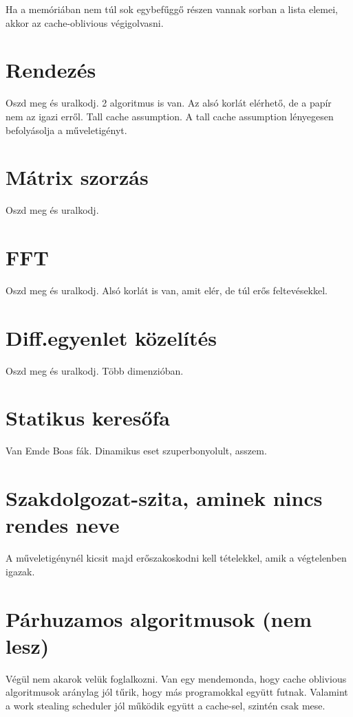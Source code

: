 \documentclass[12pt]{report}
\begin{document}
Ha a memóriában nem túl sok egybefűggő részen vannak sorban a lista elemei, akkor az cache-oblivious végigolvasni.

\section{Rendezés}

Oszd meg és uralkodj. 2 algoritmus is van. Az alsó korlát elérhető, de a papír nem az igazi erről. Tall cache assumption. A tall cache assumption lényegesen befolyásolja a műveletigényt.

\section{Mátrix szorzás}

Oszd meg és uralkodj.

\section{FFT}

Oszd meg és uralkodj. Alsó korlát is van, amit elér, de túl erős feltevésekkel.

\section{Diff.egyenlet közelítés}

Oszd meg és uralkodj. Több dimenzióban.

\section{Statikus keresőfa}

Van Emde Boas fák. Dinamikus eset szuperbonyolult, asszem.

\section{Szakdolgozat-szita, aminek nincs rendes neve}

A műveletigénynél kicsit majd erőszakoskodni kell tételekkel, amik a végtelenben igazak.

\section{Párhuzamos algoritmusok (nem lesz)}

Végül nem akarok velük foglalkozni. Van egy mendemonda, hogy cache oblivious algoritmusok aránylag jól tűrik, hogy más programokkal együtt futnak. Valamint a work stealing scheduler jól működik együtt a cache-sel, szintén csak mese.
\end{document}
